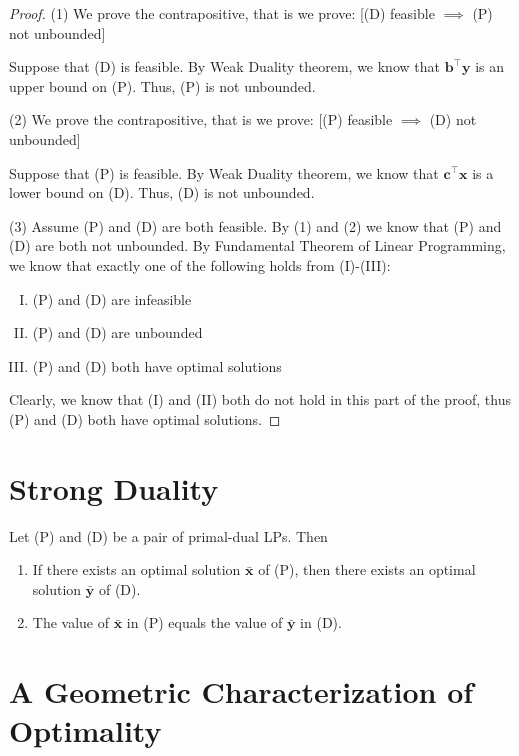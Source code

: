 \begin{proof}
    (1) We prove the contrapositive, that is we prove:
    [(D) feasible $ \implies $ (P) not unbounded]

    Suppose that (D) is feasible. By Weak Duality theorem, we know that
    $ \bm{b}^\top \bm{y} $ is an upper bound on (P). Thus, (P) is not
    unbounded.

    (2) We prove the contrapositive, that is we prove:
    [(P) feasible $ \implies $ (D) not unbounded]

    Suppose that (P) is feasible. By Weak Duality theorem, we know that
    $ \bm{c}^\top \bm{x} $ is a lower bound on (D). Thus, (D) is not
    unbounded.

    (3) Assume (P) and (D) are both feasible. By (1) and (2) we know that
    (P) and (D) are both not unbounded. By Fundamental Theorem of Linear
    Programming, we know that exactly one of the following holds
    from (I)-(III):
    \begin{enumerate}[(I)]
        \item (P) and (D) are infeasible
        \item (P) and (D) are unbounded
        \item (P) and (D) both have optimal solutions
    \end{enumerate}
    Clearly, we know that (I) and (II) both do not hold in this part of the proof,
    thus (P) and (D) both have optimal solutions.
\end{proof}

\section{Strong Duality}
\begin{thmbox}
    \begin{theorem}
        Let (P) and (D) be a pair of primal-dual LPs. Then
        \begin{enumerate}[(1)]
            \item If there exists an optimal solution $ \bm{\bar{x}} $ of (P), then there exists an optimal solution $ \bm{\bar{y}} $ of (D).
            \item The value of $ \bm{\bar{x}} $ in (P) equals the value of $ \bm{\bar{y}} $ in (D).
        \end{enumerate}
    \end{theorem}
\end{thmbox}

\section{A Geometric Characterization of Optimality}

